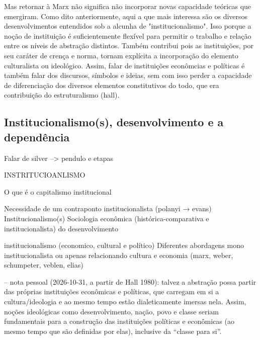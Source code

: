 Mas retornar à Marx não significa não incorporar novas capacidade teóricas que emergiram. Como dito anteriormente, aqui a que mais interessa são os diversos desenvolvimentos entendidos sob a alcunha de "institucionalismo". Isso porque a noção de instituição é suficientemente flexível para permitir o trabalho e relação entre os níveis de abstração distintos. Também contribui pois as instituições, por seu caráter de crença e norma, tornam explícita a incorporação do elemento culturalista ou ideológico. Assim, falar de instituições econômcias e políticas é também falar dos discursos, símbolos e ideias, sem com isso perder a capacidade de diferenciação dos diversos elementos constitutivos do todo, que era contribuição do estruturalismo (hall).




\subsection{Institucionalismo(s), desenvolvimento e a dependência}
Falar de silver --> pendulo e etapas

INSTRITUCIOANLISMO


O que é o capitalismo institucional




Necessidade de um contraponto institucionalista (polanyi → evans)
Institucionalismo(s)
Sociologia econômica (histórica-comparativa e institucionalista) do
desenvolvimento

institucionalismo (economico, cultural e político)
Diferentes abordagens mono institucionalista ou apenas relacionando
cultura e economia (marx, weber, schumpeter, veblen, elias)

-- nota pessoal (2026-10-31, a partir de Hall 1980): talvez a abstração possa partir das próprias instituições econômicas e políticas, que carregam em si a cultura/ideologia e ao mesmo tempo estão dialeticamente imersas nela. Assim, noções ideológicas como desenvolvimento, nação, povo e classe seriam fundamentais para a construção das instituições políticas e econômicas (ao mesmo tempo que são definidas por elas), inclusive da ``classe para si''.

